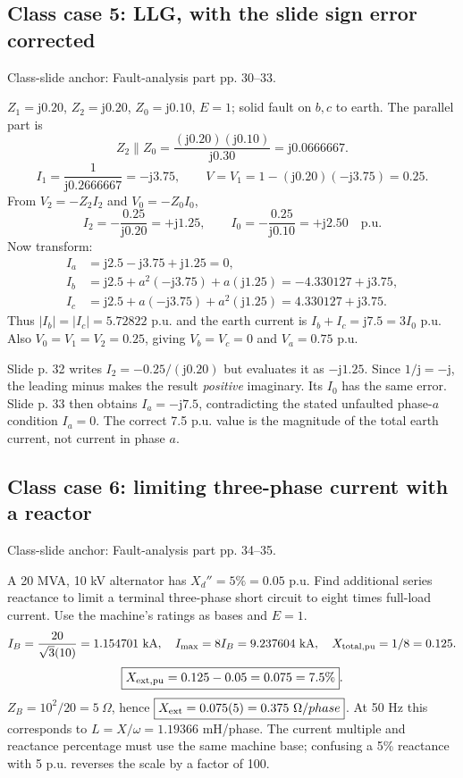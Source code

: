 \documentclass[11pt,a4paper]{article}
\newenvironment{Caution}[1]{\begin{tcolorbox}[colback=warm,colframe=rust,coltitle=white,title={#1}]}{\end{tcolorbox}}
\newcommand{\slides}[1]{{\small\color{muted}\textsf{Class-slide anchor: #1.}}\par}
\newcommand{\ans}[1]{\boxed{#1}}
\newcommand{\jj}{\mathrm j}
\begin{document}
\subsection{Class case 5: LLG, with the slide sign error corrected}
\slides{Fault-analysis part pp. 30--33}
$Z_1=\jj0.20$, $Z_2=\jj0.20$, $Z_0=\jj0.10$, $E=1$; solid fault on $b,c$ to earth. The parallel part is
\[
 Z_2\parallel Z_0=\frac{(\jj0.20)(\jj0.10)}{\jj0.30}=\jj0.0666667.
\]
\[
 I_1=\frac1{\jj0.2666667}=-\jj3.75,\qquad
 V=V_1=1-(\jj0.20)(-\jj3.75)=0.25.
\]
From $V_2=-Z_2I_2$ and $V_0=-Z_0I_0$,
\[
 \ans{I_2=-\frac{0.25}{\jj0.20}=+\jj1.25},\qquad
 \ans{I_0=-\frac{0.25}{\jj0.10}=+\jj2.50}\quad\mathrm{p.u.}
\]
Now transform:
\begin{align*}
 I_a&=\jj2.5-\jj3.75+\jj1.25=\ans{0},\\
 I_b&=\jj2.5+a^2(-\jj3.75)+a(\jj1.25)=\ans{-4.330127+\jj3.75},\\
 I_c&=\jj2.5+a(-\jj3.75)+a^2(\jj1.25)=\ans{4.330127+\jj3.75}.
\end{align*}
Thus $|I_b|=|I_c|=5.72822$ p.u. and the earth current is $I_b+I_c=\ans{\jj7.5=3I_0}$ p.u. Also $V_0=V_1=V_2=0.25$, giving $V_b=V_c=0$ and $V_a=0.75$ p.u.
\begin{Caution}{The physical check exposes the arithmetic error}
Slide p. 32 writes $I_2=-0.25/(\jj0.20)$ but evaluates it as $-\jj1.25$. Since $1/\jj=-\jj$, the leading minus makes the result \emph{positive} imaginary. Its $I_0$ has the same error. Slide p. 33 then obtains $I_a=-\jj7.5$, contradicting the stated unfaulted phase-$a$ condition $I_a=0$. The correct 7.5 p.u. value is the magnitude of the total earth current, not current in phase $a$.
\end{Caution}

\subsection{Class case 6: limiting three-phase current with a reactor}
\slides{Fault-analysis part pp. 34--35}
A 20 MVA, 10 kV alternator has $X_d''=5\%=0.05$ p.u. Find additional series reactance to limit a terminal three-phase short circuit to eight times full-load current. Use the machine's ratings as bases and $E=1$.
\[
 I_B=\frac{20}{\sqrt3(10)}=1.154701\ \mathrm{kA},\quad
 I_{\max}=8I_B=9.237604\ \mathrm{kA},\quad
 X_{\rm total,pu}=1/8=0.125.
\]
\[
 \ans{X_{\rm ext,pu}=0.125-0.05=0.075=7.5\%}.
\]
$Z_B=10^2/20=5\ \Omega$, hence $\ans{X_{\rm ext}=0.075(5)=0.375\ \Omega/phase}$. At 50 Hz this corresponds to $L=X/\omega=1.19366$ mH/phase. The current multiple and reactance percentage must use the same machine base; confusing a 5\% reactance with 5 p.u. reverses the scale by a factor of 100.
\end{document}
